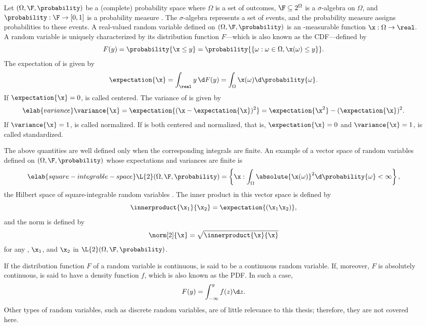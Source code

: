 Let $(\Omega, \F, \probability)$ be a (complete) probability space where
$\Omega$ is a set of outcomes, $\F \subseteq 2^\Omega$ is a $\sigma$-algebra on
$\Omega$, and $\probability: \F \to [0, 1]$ is a probability measure
\cite{durrett2010}. The $\sigma$-algebra represents a set of events, and the
probability measure assigns probabilities to these events. A real-valued random
variable defined on $(\Omega, \F, \probability)$ is an \F-measurable function
$\x: \Omega \to \real$. A random variable \x is uniquely characterized by its
distribution function $F$---which is also known as the \ac{CDF}---defined by
\begin{equation*}
  F(y) = \probability{\x \leq y} = \probability{\{ \omega: \omega \in \Omega, \x(\omega) \leq y \}}.
\end{equation*}
The expectation of \x is given by
\[
  \expectation{\x} = \int_\real y \, \d F(y) = \int_\Omega \x(\omega) \d \probability{\omega}.
\]
If $\expectation{\x} = 0$, \x is called centered. The variance of \x is given
by
\begin{equation} \elab{variance}
  \variance{\x}
  = \expectation{(\x - \expectation{\x})^2}
  = \expectation{\x^2} - (\expectation{\x})^2.
\end{equation}
If $\variance{\x} = 1$, \x is called normalized. If \x is both centered and
normalized, that is, $\expectation{\x} = 0$ and $\variance{\x} = 1$, \x is
called standardized.

The above quantities are well defined only when the corresponding integrals are
finite. An example of a vector space of random variables defined on $(\Omega,
\F, \probability)$ whose expectations and variances are finite is
\begin{equation} \elab{square-integrable-space}
  \L{2}(\Omega, \F, \probability) = \left\{ \x: \int_\Omega \absolute{\x(\omega)}^2 \d \probability{\omega} < \infty \right\},
\end{equation}
the Hilbert space of square-integrable random variables \cite{janson1997}. The
inner product in this vector space is defined by
\[
  \innerproduct{\x_1}{\x_2} = \expectation{(\x_1 \x_2)},
\]
and the norm is defined by
\[
  \norm[2]{\x} = \sqrt{\innerproduct{\x}{\x}}
\]
for any \x, $\x_1$, and $\x_2$ in $\L{2}(\Omega, \F, \probability)$.

If the distribution function $F$ of a random variable \x is continuous, \x is
said to be a continuous random variable. If, moreover, $F$ is absolutely
continuous, \x is said to have a density function $f$, which is also known as
the \ac{PDF}. In such a case,
\[
  F(y) = \int_{-\infty}^y f(z) \d z.
\]
Other types of random variables, such as discrete random variables, are of
little relevance to this thesis; therefore, they are not covered here.


